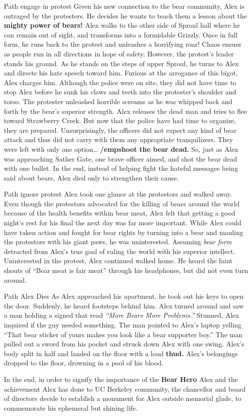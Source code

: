 \documentclass{article}
\begin{document}
Path engage in protest
Given his new connection to the bear community, Alex is outraged by the protesters. He decides he wants to teach them a lesson about the \textbf{mighty power of bears!} Alex walks to the other side of Sproul hall where he can remain out of sight, and transforms into a formidable Grizzly. Once in full form, he runs back to the protest and unleashes a horrifying roar! Chaos ensues as people run in all directions in hope of safety. However, the protest’s leader stands his ground. As he stands on the steps of upper Sproul, he turns to Alex and directs his hate speech toward him. Furious at the arrogance of this bigot, Alex charges him. Although the police were on site, they did not have time to stop Alex before he sunk his claws and teeth into the protester’s shoulder and torso. The protester unleashed horrible screams as he was whipped back and forth by the bear’s superior strength. Alex releases the dead man and tries to flee toward Strawberry Creek. But now that the police have had time to organize, they are prepared. Unsurprisingly, the officers did not expect any kind of bear attack and thus did not carry with them any appropriate tranquilizers. They were left with only one option… \textbf{/emp{shoot the bear dead.}} So, just as Alex was approaching Sather Gate, one brave officer aimed, and shot the bear dead with one bullet. In the end, instead of helping fight the hateful messages being said about bears, Alex died only to strengthen their cause. 







Path ignore protest
Alex took one glance at the protestors and walked away. Even though the protestors advocated for the killing of bears around the world because of the health benefits within bear meat, Alex felt that getting a good night’s rest for his final the next day was far more important. While Alex could have taken action and fought for bear rights by turning into a bear and mauling the protestors with his giant paws, he was uninterested. Assuming \textit {bear form} detracted from Alex’s true goal of ruling the world with his superior intellect. Uninterested in the protest, Alex continued walked home. He heard the faint shouts of “Bear meat is fair meat” through his headphones, but did not even turn around.






Path Alex Dies
As Alex approached his apartment, he took out his keys to open the door. Suddenly, he heard footsteps behind him. Alex turned around and saw a man holding a signed that read \textit {“More Bears More Problems.”} Stunned, Alex inquired if the guy needed something. The man pointed to Alex’s laptop yelling “That bear sticker of yours makes you look like a bear supporter boy.” The man pulled out a sword from his pocket and struck down Alex with one swing. Alex’s body split in half and landed on the floor with a loud \textbf {thud.} Alex’s belongings dropped to the floor, drowning in a pool of his blood.

In the end, in order to signify the importance of the \textbf{Bear Hero} Alex and the achievement Alex has done to UC Berkeley community, the chancellor and board of directors decide to establish a monument for Alex outside memorial glade, to commemorate his ephemeral but shining life.
\end{document}
